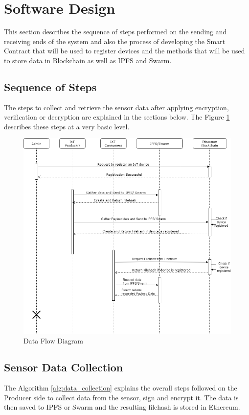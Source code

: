 \documentclass[11pt,openright]{report}
\begin{document}
\section{Software Design} \label{ss:software_design}
This section describes the sequence of steps performed on the sending and receiving ends of the system and also the process of developing the Smart Contract that will be used to register devices and the methods that will be used to store data in Blockchain as well as IPFS and Swarm.

\subsection{Sequence of Steps}
The steps to collect and retrieve the sensor data after applying encryption, verification or decryption are explained in the sections below. The Figure \ref{fig:dataflow_diagram} describes these steps at a very basic level.

\begin{figure}
	\centering
	\includegraphics[scale=0.5]{images/SequenceDiagram.png}
	\caption{Data Flow Diagram}
	\label{fig:dataflow_diagram}
\end{figure}

\newpage
\subsection{Sensor Data Collection}
The Algorithm \ref{alg:data_collection} explains the overall steps followed on the Producer side to collect data from the sensor, sign and encrypt it. The data is then saved to IPFS or Swarm and the resulting filehash is stored in Ethereum.
\end{document}
